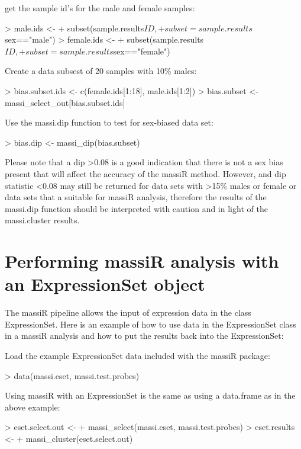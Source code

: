 \documentclass{article}
\begin{document}
get the sample id's for the male and female samples:
\begin{Schunk}
\begin{Sinput}
> male.ids <-
+   subset(sample.results$ID,
+                    subset=sample.results$sex=="male")
> female.ids <-
+   subset(sample.results$ID,
+          subset=sample.results$sex=="female")
\end{Sinput}
\end{Schunk}
Create a data subsest of 20 samples with 10\% males:
\begin{Schunk}
\begin{Sinput}
> bias.subset.ids <- c(female.ids[1:18], male.ids[1:2])
> bias.subset <- massi_select_out[bias.subset.ids]
\end{Sinput}
\end{Schunk}
Use the massi.dip function to test for sex-biased data set:
\begin{Schunk}
\begin{Sinput}
> bias.dip <- massi_dip(bias.subset)
\end{Sinput}
\end{Schunk}

Please note that a dip >0.08 is a good indication that there is not a sex bias present that will affect the accuracy of the massiR method. However, and dip statistic <0.08 may still be returned for data sets with >15\% males or female or data sets that a suitable for massiR analysis, therefore the results of the massi.dip function should be interpreted with caution and in light of the massi.cluster results.

\section{Performing massiR analysis with an ExpressionSet object}

The massiR pipeline allows the input of expression data in the class ExpressionSet. 
Here is an example of how to use data in the ExpressionSet class in a massiR analysis and how to put the results back into the ExpressionSet:

Load the example ExpressionSet data included with the massiR package:
\begin{Schunk}
\begin{Sinput}
> data(massi.eset, massi.test.probes)
\end{Sinput}
\end{Schunk}

Using massiR with an ExpressionSet is the same as using a data.frame as in the above example:
\begin{Schunk}
\begin{Sinput}
> eset.select.out <- 
+   massi_select(massi.eset, massi.test.probes)
> eset.results <- 
+   massi_cluster(eset.select.out)
\end{Sinput}
\end{Schunk}
\end{document}
